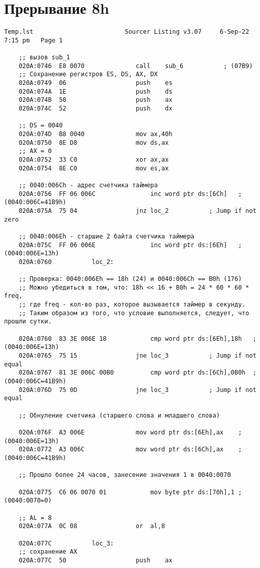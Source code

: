 \documentclass[a4paper,12pt]{bmstu}
\begin{document}
\section{Прерывание 8h}\label{sec:Dis_int}
\begin{lstlisting}[style={asm},label={lst:INT8H}]
    Temp.lst						 Sourcer Listing v3.07     6-Sep-22   7:15 pm   Page 1

    ;; вызов sub_1
    020A:0746  E8 0070				call	sub_6			; (07B9)
    ;; Сохранение регистров ES, DS, AX, DX
    020A:0749  06					push	es
    020A:074A  1E					push	ds
    020A:074B  50					push	ax
    020A:074C  52					push	dx

    ;; DS = 0040
    020A:074D  B8 0040				mov	ax,40h
    020A:0750  8E D8				mov	ds,ax
    ;; AX = 0
    020A:0752  33 C0				xor	ax,ax
    020A:0754  8E C0				mov	es,ax

    ;; 0040:006Ch - адрес счетчикa таймера
    020A:0756  FF 06 006C				inc	word ptr ds:[6Ch]	; (0040:006C=41B9h)
    020A:075A  75 04				jnz	loc_2			; Jump if not zero

    ;; 0040:006Eh - старшие 2 байта счетчикa таймера
    020A:075C  FF 06 006E				inc	word ptr ds:[6Eh]	; (0040:006E=13h)
    020A:0760			loc_2:

    ;; Проверка: 0040:006Eh == 18h (24) и 0040:006Ch == B0h (176)
    ;; Можно убедиться в том, что: 18h << 16 + B0h = 24 * 60 * 60 * freq,
    ;; где freq - кол-во раз, которое вызывается таймер в секунду.
    ;; Таким образом из того, что условие выполняется, следует, что прошли сутки.

    020A:0760  83 3E 006E 18			cmp	word ptr ds:[6Eh],18h	; (0040:006E=13h)
    020A:0765  75 15				jne	loc_3			; Jump if not equal
    020A:0767  81 3E 006C 00B0			cmp	word ptr ds:[6Ch],0B0h	; (0040:006C=41B9h)
    020A:076D  75 0D				jne	loc_3			; Jump if not equal

    ;; Обнуление счетчика (старшего слова и младшего слова)

    020A:076F  A3 006E				mov	word ptr ds:[6Eh],ax	; (0040:006E=13h)
    020A:0772  A3 006C				mov	word ptr ds:[6Ch],ax	; (0040:006C=41B9h)

    ;; Прошло более 24 часов, занесение значения 1 в 0040:0070

    020A:0775  C6 06 0070 01			mov	byte ptr ds:[70h],1	; (0040:0070=0)

    ;; AL = 8
    020A:077A  0C 08				or	al,8

    020A:077C			loc_3:
    ;; cохранение AX
    020A:077C  50					push	ax


\end{lstlisting}
\end{document}
